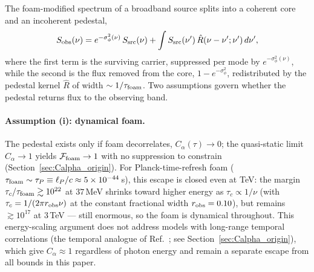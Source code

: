 \documentclass[aps,prd,onecolumn,amsmath,amssymb]{revtex4-2}
\begin{document}
The foam-modified spectrum of a broadband source splits into a coherent
core and an incoherent pedestal,
\begin{equation}
  S_{\rm obs}(\nu)
    = e^{-\sigma_\phi^2(\nu)}\,S_{\rm src}(\nu)
    + \int S_{\rm src}(\nu')\,\hat{R}(\nu-\nu';\nu')\,d\nu',
  \label{eq:robs_decomp}
\end{equation}
where the first term is the surviving carrier,
suppressed per mode by $e^{-\sigma_\phi^2(\nu)}$, while the second is the
flux removed from the core, $1-e^{-\sigma_\phi^2}$, redistributed by the
pedestal kernel $\hat{R}$ of width $\sim1/\tau_{\rm foam}$.
Two assumptions govern whether the pedestal returns flux to the
observing band.

\paragraph{Assumption (i): dynamical foam.}  The pedestal exists only if foam
decorrelates, $C_\alpha(\tau)\to0$; the quasi-static limit $C_\alpha\to1$
yields $\mathcal{F}_{\rm foam}\to1$ with no suppression to constrain
(Section~\ref{sec:Calpha_origin}).  For Planck-time-refresh foam
($\tau_{\rm foam}\sim\tau_P\equiv\ell_P/c\approx5\times10^{-44}$\,s),
this escape is closed even at TeV: the margin
$\tau_c/\tau_{\rm foam}\gtrsim10^{22}$ at $37$\,MeV shrinks toward
higher energy as $\tau_c\propto1/\nu$ (with $\tau_c=1/(2\pi r_{\rm obs}\nu)$
at the constant fractional width $r_{\rm obs}=0.10$), but
remains $\gtrsim10^{17}$ at $3$\,TeV --- still enormous, so the foam is
dynamical throughout.
This energy-scaling argument does not address models with long-range
temporal correlations (the temporal analogue of
Ref.~\cite{LeeZurekChen2024}; see Section~\ref{sec:Calpha_origin}),
which give $C_\alpha\approx1$ regardless of photon energy and remain a
separate escape from all bounds in this paper.
\end{document}
